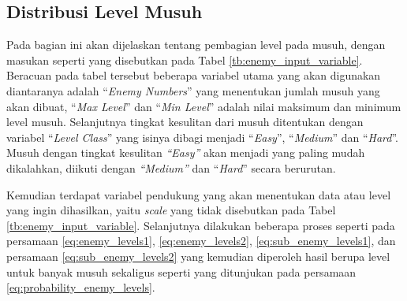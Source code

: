 \subsection{Distribusi Level Musuh}
\label{sec:sub_sec3_enemy_level}
\vspace{1ex}

Pada bagian ini akan dijelaskan tentang pembagian level pada musuh, dengan masukan seperti yang disebutkan pada Tabel \ref{tb:enemy_input_variable}. Beracuan pada tabel tersebut beberapa variabel utama yang akan digunakan diantaranya adalah ``\textit{Enemy Numbers}'' yang menentukan jumlah musuh yang akan dibuat, ``\textit{Max Level}'' dan ``\textit{Min Level}'' adalah nilai maksimum dan minimum level musuh. Selanjutnya tingkat kesulitan dari musuh ditentukan dengan variabel ``\textit{Level Class}'' yang isinya dibagi menjadi ``\textit{Easy}'', ``\textit{Medium}'' dan ``\textit{Hard}''. Musuh dengan tingkat kesulitan \textit{``Easy''} akan menjadi yang paling mudah dikalahkan, diikuti dengan \textit{``Medium''} dan ``\textit{Hard}'' secara berurutan.
\vspace{1ex}

Kemudian terdapat variabel pendukung yang akan menentukan data atau level yang ingin dihasilkan, yaitu \textit{scale} yang tidak disebutkan pada Tabel \ref{tb:enemy_input_variable}. Selanjutnya dilakukan beberapa proses seperti pada persamaan \ref{eq:enemy_levels1}, \ref{eq:enemy_levels2}, \ref{eq:sub_enemy_levels1}, dan persamaan \ref{eq:sub_enemy_levels2} yang kemudian diperoleh hasil berupa level untuk banyak musuh sekaligus seperti yang ditunjukan pada persamaan \ref{eq:probability_enemy_levels}.
\vspace{1ex}

